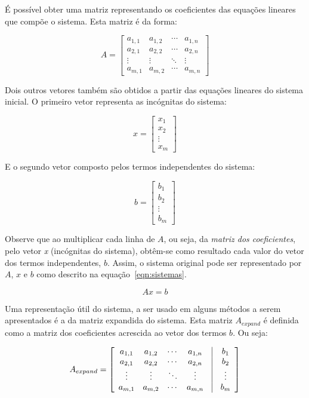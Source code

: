 \documentclass[a4paper,10pt]{report}
\begin{document}
É possível obter uma matriz representando os coeficientes das equações lineares que compõe o sistema. Esta matriz é da forma:

\[
A = \left[ \begin{array}{cccc}
a_{1,1} & a_{1,2} & \cdots & a_{1,n} \\
a_{2,1} & a_{2,2} & \cdots & a_{2,n} \\
\vdots  & \vdots & \ddots & \vdots \\
a_{m,1} & a_{m,2} & \cdots & a_{m,n}
\label{arr:coeficientes}
\end{array}\right]
\]

Dois outros vetores também são obtidos a partir das equações lineares do sistema inicial. O primeiro vetor representa as incógnitas do sistema:

\[
x = \left[ \begin{array}{c}
x_{1} \\
x_{2} \\
\vdots \\
x_{m}
\label{arr:icognitas}
\end{array}\right]
\]

E o segundo vetor composto pelos termos independentes do sistema:

\[
b = \left[ \begin{array}{c}
b_{1} \\
b_{2} \\
\vdots \\
b_{m}
\label{arr:termos}
\end{array}\right]
\]

Observe que ao multiplicar cada linha de $A$, ou seja, da \textit{matriz dos coeficientes}, pelo vetor \textit{x} (incógnitas do sistema), obtêm-se como resultado cada valor do vetor dos termos independentes, $b$. Assim, o sistema original pode ser representado por $A$, $x$ e $b$ como descrito na equação~\ref{eqn:sistemas}.

\begin{equation}
Ax = b
\label{eqn:sistemas}
\end{equation} 

Uma representação útil do sistema, a ser usado em alguns métodos a serem apresentados é a da matriz expandida do sistema. Esta matriz $A_{expand}$ é definida como a matriz dos coeficientes acrescida ao vetor dos termos $b$. Ou seja:

\[
A_{expand} = \left[ \begin{array}{cccccc}
a_{1,1} & a_{1,2} & \cdots & a_{1,n} & \vline & b_{1} \\
a_{2,1} & a_{2,2} & \cdots & a_{2,n} & \vline & b_{2} \\
\vdots  & \vdots & \ddots & \vdots & \vline & \vdots \\
a_{m,1} & a_{m,2} & \cdots & a_{m,n} & \vline & b_{m} 
\label{arr:coeficientes}
\end{array}\right]
\]
\end{document}
